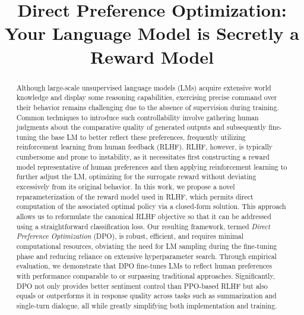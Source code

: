 \title{Direct Preference Optimization: Your Language Model is Secretly a Reward Model}

\begin{abstract}
Although large-scale unsupervised language models (LMs) acquire extensive world knowledge and display some reasoning capabilities, exercising precise command over their behavior remains challenging due to the absence of supervision during training. Common techniques to introduce such controllability involve gathering human judgments about the comparative quality of generated outputs and subsequently fine-tuning the base LM to better reflect these preferences, frequently utilizing reinforcement learning from human feedback (RLHF). RLHF, however, is typically cumbersome and prone to instability, as it necessitates first constructing a reward model representative of human preferences and then applying reinforcement learning to further adjust the LM, optimizing for the surrogate reward without deviating excessively from its original behavior. In this work, we propose a novel reparameterization of the reward model used in RLHF, which permits direct computation of the associated optimal policy via a closed-form solution. This approach allows us to reformulate the canonical RLHF objective so that it can be addressed using a straightforward classification loss. Our resulting framework, termed \textit{Direct Preference Optimization} (DPO), is robust, efficient, and requires minimal computational resources, obviating the need for LM sampling during the fine-tuning phase and reducing reliance on extensive hyperparameter search. Through empirical evaluation, we demonstrate that DPO fine-tunes LMs to reflect human preferences with performance comparable to or surpassing traditional approaches. Significantly, DPO not only provides better sentiment control than PPO-based RLHF but also equals or outperforms it in response quality across tasks such as summarization and single-turn dialogue, all while greatly simplifying both implementation and training.
\end{abstract}


